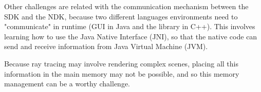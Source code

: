 \par
Other challenges are related with the communication mechanism between the SDK and the NDK, because two different languages environments need to "communicate" in runtime (GUI in Java and the library in C++).
This involves learning how to use the Java Native Interface (JNI), so that the native code can send and receive information from Java Virtual Machine (JVM).

\par
Because ray tracing may involve rendering complex scenes, placing all this information in the main memory may not be possible, and so this memory management can be a worthy challenge.